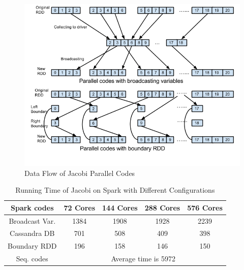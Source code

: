 \begin{figure}[H]
\centering
\includegraphics[scale=.6]{figures/JacobiCode.png}
\caption{Data Flow of Jacobi Parallel Codes}
\label{JacobiCode}
\end{figure}


\begin{table}[H]
\caption{Running Time of Jacobi on Spark with Different Configurations}
\centering
\begin{tabular}{||c| c c c c ||} 
 \hline
 Spark codes & 72 Cores & 144 Cores & 288 Cores & 576 Cores \\ [0.5ex] 
 \hline
 Broadcast Var. & 1384 & 1908 & 1928 & 2239 \\ 
 Cassandra DB   & 701  & 508  & 409  & 398  \\
 Boundary RDD   & 196  & 158  & 146  & 150  \\
 \hline
 \hline
 Seq. codes & \multicolumn{4}{c||}{Average time is 5972} \\ 
 \hline
\end{tabular}
\label{table:JacobiSpark}
\end{table}


